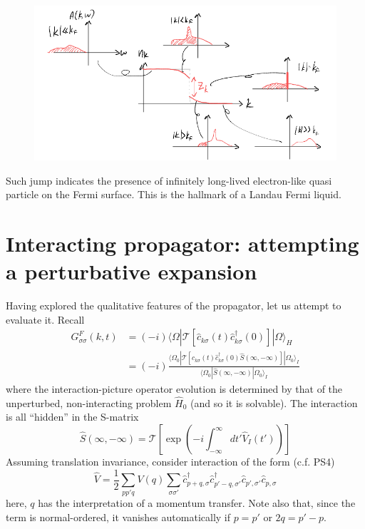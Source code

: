 \begin{figure}[ht]
    \centering
    \includegraphics[width=\textwidth]{jupyterbook/data/fig/lec16-fig05.png}
\end{figure}

Such jump indicates the presence of infinitely long-lived electron-like quasi particle on the Fermi surface. This is the hallmark of a Landau Fermi liquid.

\section{Interacting propagator: attempting a perturbative expansion}

Having explored the qualitative features of the propagator, let us attempt to evaluate it. Recall
\begin{align*}
    G_{\sigma \sigma}^{F}\left( k,t \right) &=\left( -i \right) \langle \Omega |\mathcal{T} \left[ \hat{c}_{k\sigma}\left( t \right) \hat{c}_{k\sigma}^{\dagger}\left( 0 \right) \right] |\Omega \rangle _H\\
    &=\left( -i \right) \frac{\langle \Omega _0|\mathcal{T} \left[ \hat{c}_{k\sigma}\left( t \right) \hat{c}_{k\sigma}^{\dagger}\left( 0 \right) \hat{S}\left( \infty ,-\infty \right) \right] |\Omega _0\rangle _I}{\langle \Omega _0|\hat{S}\left( \infty ,-\infty \right) |\Omega _0\rangle _I}
\end{align*}
where the interaction-picture operator evolution is determined by  that of the unperturbed, non-interacting problem $\hat{H}_0$ (and so it is solvable). The interaction is all ``hidden'' in the S-matrix
\[ \hat{S}\left( \infty ,-\infty \right) =\mathcal{T} \left[ \exp \left( -i\int_{-\infty}^{\infty}{dt'\hat{V}_I\left( t' \right)} \right) \right] \]
Assuming translation invariance, consider interaction of the form (c.f. PS4)
\[ \hat{V}=\frac{1}{2}\sum_{pp'q}{V\left( q \right) \sum_{\sigma \sigma '}{\hat{c}_{p+q,\sigma}^{\dagger}\hat{c}_{p'-q,\sigma '}^{\dagger}\hat{c}_{p',\sigma '}\hat{c}_{p,\sigma}}}\]
here, $q$ has the interpretation of a momentum transfer. Note also that, since the term is normal-ordered, it vanishes automatically if $p=p\prime$ or $2q=p\prime -p$.

